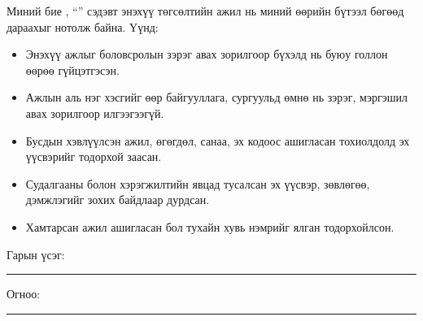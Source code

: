 \begin{declaration}
\addchaptertocentry{\authorshipname}

\noindent Миний бие \shortname, ``\ttitle'' сэдэвт энэхүү төгсөлтийн ажил нь миний өөрийн бүтээл бөгөөд дараахыг нотолж байна. Үүнд:

\begin{itemize}
    \item Энэхүү ажлыг боловсролын зэрэг авах зорилгоор бүхэлд нь буюу голлон өөрөө гүйцэтгэсэн.
    \item Ажлын аль нэг хэсгийг өөр байгууллага, сургуульд өмнө нь зэрэг, мэргэшил авах зорилгоор илгээгээгүй.
    \item Бусдын хэвлүүлсэн ажил, өгөгдөл, санаа, эх кодоос ашигласан тохиолдолд эх үүсвэрийг тодорхой заасан.
    \item Судалгааны болон хэрэгжилтийн явцад тусалсан эх үүсвэр, зөвлөгөө, дэмжлэгийг зохих байдлаар дурдсан.
    \item Хамтарсан ажил ашигласан бол тухайн хувь нэмрийг ялган тодорхойлсон.
\end{itemize}
\bigskip

\noindent Гарын үсэг: \rule[-0.5em]{12.7em}{0.5pt}
\bigskip

\noindent Огноо: \rule[-0.5em]{15em}{0.5pt}
\end{declaration}

